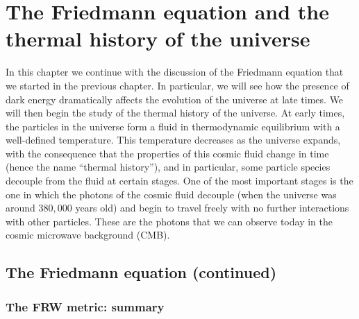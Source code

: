 \chapter{The Friedmann equation and the thermal history of the universe}

In this chapter we continue with the discussion of the Friedmann equation that we started in the previous chapter. In particular, we will see how the presence of dark energy dramatically affects the evolution of the universe at late times. We will then begin the study of the thermal history of the universe. At early times, the particles in the universe form a fluid in thermodynamic equilibrium with a well-defined temperature. This temperature decreases as the universe expands, with the consequence that the properties of this cosmic fluid change in time (hence the name ``thermal history''), and in particular, some particle species decouple from the fluid at certain stages. One of the most important stages is the one in which the photons of the cosmic fluid decouple (when the universe was around $380,000$ years old) and begin to travel freely with no further interactions with other particles. These are the photons that we can observe today in the cosmic microwave background (CMB).

\section{The Friedmann equation (continued)}

\subsection{The FRW metric: summary}

